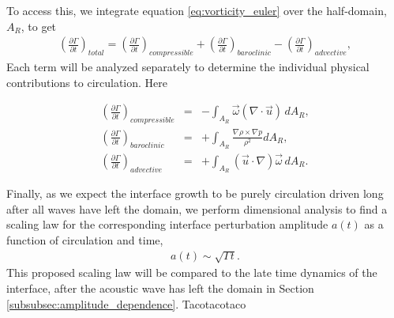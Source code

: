 To access this, we integrate equation \eqref{eq:vorticity_euler} over
the half-domain, $A_R$, to get
\begin{align} \label{eq:circulation_generation}
  \left(\frac{\partial \Gamma}{\partial t}\right)_{total} =%
  \left(\frac{\partial \Gamma}{\partial t}\right)_{compressible} + \left(\frac{\partial \Gamma}{\partial t}\right)_{baroclinic} - \left(\frac{\partial \Gamma}{\partial t}\right)_{advective},
\end{align}
%
Each term will be analyzed separately to determine the individual
physical contributions to circulation. Here
%
\addtocounter{equation}{-1}
\begin{subequations}\label{eq:circulation_generation_components}%
  \begin{align}%
    &\left(\frac{\partial \Gamma}{\partial t}\right)_{compressible} &=& -\int_{A_R} \vec{\omega}\left(\nabla\cdot\vec{u}\right) \, dA_R,&\\
    &\left(\frac{\partial \Gamma}{\partial t}\right)_{baroclinic} &=& +\int_{A_R} \frac{\nabla\rho\times\nabla p}{\rho^2} dA_R,&\\
    &\left(\frac{\partial \Gamma}{\partial t}\right)_{advective} &=& +\int_{A_R} \left(\vec{u}\cdot\nabla\right)\vec{\omega} \, dA_R.&
  \end{align}
\end{subequations}
%

Finally, as we expect the interface growth to be purely circulation driven
long after all waves have left the domain, we perform dimensional
analysis to find a scaling law for the corresponding interface
perturbation amplitude $a(t)$ as a function of circulation and time,
\begin{align} \label{eq:intf_circ_scaling}
  a(t) \sim \sqrt{\Gamma t}.
\end{align}
This proposed scaling law will be compared to the late time dynamics
of the interface, after the acoustic wave has left the domain in
Section \ref{subsubsec:amplitude_dependence}. Tacotacotaco

